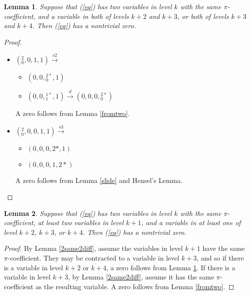 \documentclass[12pt]{amsart}
\newtheorem{lemma}{Lemma}
\begin{document}
\begin{lemma}\label{2same2more}
Suppose that (\ref{eq}) has two variables in level $k$ with the same $\pi$-coefficient, and a variable in both of levels $k+2$ and $k+3$, or both of levels $k+3$ and $k+4$.  Then (\ref{eq}) has a nontrivial zero.
\end{lemma}
\begin{proof}~
\begin{itemize}
    \item $({}^{2}_{0}, 0, 1, 1) \xrightarrow{s2}$
    \begin{itemize}
        \item $(0, 0, {}^{2*}_{0}, 1)$
        \item $(0, 0, {}^{1*}_{1}, 1) \xrightarrow{d} (0, 0, 0, {}^{2*}_{0})$
    \end{itemize}

    A zero follows from Lemma \ref{fromtwo}.
    \item $({}^{2}_{0}, 0, 0, 1, 1) \xrightarrow{s3}$
    \begin{itemize}
        \item $(0, 0, 0,2*, 1)$
        \item $(0, 0, 0,1, 2*)$
    \end{itemize}
    
    A zero follows from Lemma \ref{slide} and Hensel's Lemma.
\end{itemize}
\end{proof}

\begin{lemma} \label{2and2and1}
Suppose that (\ref{eq}) has two variables in level $k$ with the same $\pi$-coefficient, at least two variables in level $k+1$, and a variable in at least one of level $k+2$, $k+3$, or $k+4$.  Then (\ref{eq}) has a nontrivial zero.
\end{lemma}
\begin{proof}
By Lemma \ref{2same2diff}, assume the variables in level $k+1$ have the same $\pi$-coefficient.  They may be contracted to a variable in level $k+3$, and so if there is a variable in level $k+2$ or $k+4$, a zero follows from Lemma \ref{2same2more}.  If there is a variable in level $k+3$, by Lemma \ref{2same2diff}, assume it has the same $\pi$-coefficient as the resulting variable.  A zero follows from Lemma \ref{fromtwo}.
\end{proof}
\end{document}
